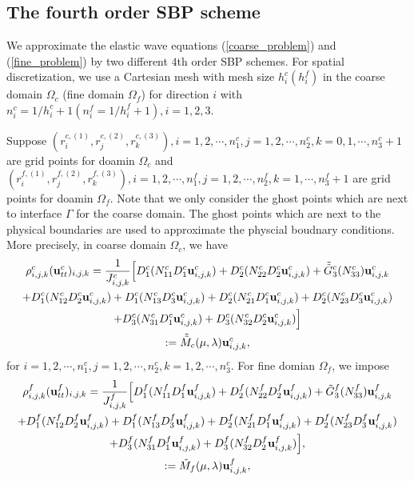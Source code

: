 \documentclass[a4paper]{article}
\begin{document}
\subsection{The fourth order SBP scheme}\label{sub_section_4_1}
We approximate the elastic wave equations (\ref{coarse_problem}) and (\ref{fine_problem}) by two different $4$th order SBP schemes. For spatial discretization, we use a Cartesian mesh with mesh size $h_i^c (h_i^f)$ in the coarse domain $\Omega_c$ (fine domain $\Omega_f$) for direction $i$ with $n_i^c = 1/h_i^c +1 (n_i^f = 1/h_i^f +1), i = 1,2,3$.

Suppose $(r^{c,(1)}_i, r^{c,(2)}_j, r^{c,(3)}_k), i = 1,2,\cdots,n_1^c, j = 1,2,\cdots,n_2^c,k=0,1,\cdots,n_3^c+1$ are grid points for doamin $\Omega_c$ and   $(r^{f,(1)}_i, r^{f,(2)}_j, r^{f,(3)}_k), i = 1,2,\cdots,n_1^f, j = 1,2,\cdots,n_2^f,k=1,\cdots,n_3^f+1$ are grid points for doamin $\Omega_f$. Note that we only consider the ghost points which are next to interface $\Gamma$ for the coarse domain. The ghost points which are next to the physical boundaries are used to approximate the physcial boudnary conditions. More precisely, in coarse domain $\Omega_c$, we have
\begin{multline}\label{coarse_scheme}
\rho_{i,j,k}^c ({\bf u}_{tt}^c)_{i,j,k} = \frac{1}{J_{i,j,k}^c}\Big[D_1^c(N_{11}^cD_1^c{\bf u}_{i,j,k}^c)+D_2^c(N_{22}^cD_2^c{\bf u}_{i,j,k}^c)+\tilde{\tilde{G}}_3^c(N_{33}^c){\bf u}_{i,j,k}^c\\
+D_1^c(N_{12}^cD_2^c{\bf u}_{i,j,k}^c)+D_1^c(N_{13}^cD_3^c{\bf u}_{i,j,k}^c)+D_2^c(N_{21}^cD_1^c{\bf u}_{i,j,k}^c)+D_2^c(N_{23}^cD_3^c{\bf u}_{i,j,k}^c)\\
+D_3^c(N_{31}^cD_1^c{\bf u}_{i,j,k}^c)+D_3^c(N_{32}^cD_2^c{\bf u}_{i,j,k}^c)\Big] \\
:= \tilde{\tilde{M}}_c(\mu,\lambda) {\bf{u}}^c_{i,j,k},
\end{multline}
for $ i = 1,2,\cdots,n_1^c, j = 1,2,\cdots,n_2^c, k = 1,2,\cdots,n_3^c$. For fine domian $\Omega_f$, we impose
\begin{multline}\label{fine_scheme_2}
\rho_{i,j,k}^f ({\bf u}_{tt}^f)_{i,j,k} =
 \frac{1}{J_{i,j,k}^f}\Big[D_1^f(N_{11}^fD_1^f{\bf u}_{i,j,k}^f)+D_2^f(N_{22}^fD_2^f{\bf u}_{i,j,k}^f)+\tilde{G}_3^f(N_{33}^f){\bf u}_{i,j,k}^f\\
+D_1^f(N_{12}^fD_2^f{\bf u}_{i,j,k}^f)+D_1^f(N_{13}^fD_3^f{\bf u}_{i,j,k}^f)
+D_2^f(N_{21}^fD_1^f{\bf u}_{i,j,k}^f)+D_2^f(N_{23}^fD_3^f{\bf u}_{i,j,k}^f)\\
+D_3^f(N_{31}^fD_1^f{\bf u}_{i,j,k}^f)
+D_3^f(N_{32}^fD_2^f{\bf u}_{i,j,k}^f)\Big], \\
:= \tilde{M}_f(\mu,\lambda) {\bf{u}}^f_{i,j,k},
\end{multline}
\end{document}
